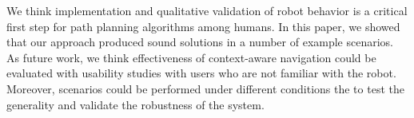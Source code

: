 \documentclass{tADR2e}
\begin{document}

We think implementation and qualitative validation of robot behavior is a critical first step for path planning algorithms among humans. In this paper, we showed that our approach produced sound solutions in a number of example scenarios. As future work, we think effectiveness of context-aware navigation could be evaluated with usability studies with users who are not familiar with the robot. Moreover, scenarios could be performed under different conditions the to test the generality and validate the robustness of the system.




\end{document}
